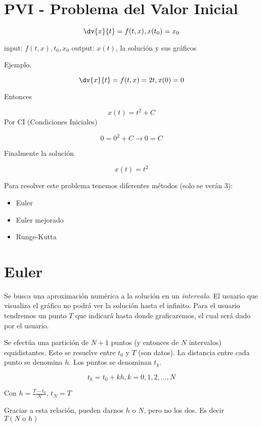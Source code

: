 \section{PVI - Problema del Valor Inicial}

$$ \dv{x}{t} = f(t,x), x(t_0) = x_0 $$

input: $ f(t,x), t_0, x_0 $
output: $ x(t) $, la soluci\'on y sus gr\'aficos


Ejemplo.

$$ \dv{x}{t} = f(t,x) = 2t, x(0) = 0 $$

Entonces

$$ x(t) = t^2 + C $$
Por CI (Condiciones Iniciales)

$$ 0 = 0^2 + C \rightarrow 0 = C $$

Finalmente la soluci\'on

$$ x(t) = t^2 $$


Para resolver este problema tenemos diferentes m\'etodos (solo se ver\'an 3):

\begin{itemize}
	\item Euler
	\item Euler mejorado
	\item Runge-Kutta

\end{itemize}

\section{Euler}

Se busca una aproximaci\'on num\'erica a la soluci\'on en un \emph{intervalo}. El usuario que visualiza el gr\'afico no podr\'a ver la soluci\'on hasta el infinito. Para el usuario tendremos un punto $T$ que indicar\'a hasta donde graficaremos, el cual ser\'a dado por el usuario.

Se efect\'ua una partici\'on de $N+1$ puntos (y entonces de $N$ intervalos) equidistantes. Esto se resuelve entre $t_0$ y $T$ (son datos). La distancia entre cada punto se denomina $h$. Los puntos se denominan $t_k$.


$$ t_k = t_0 +kh, k = 0,1,2,\dotsc,N $$

Con $h = \frac{T - t_0}{N}$, $t_N = T$

Gracias a esta relaci\'on, pueden darnos $h$ o $N$, pero no los dos. Es decir $T\left(N \text{ o } h\right)$

